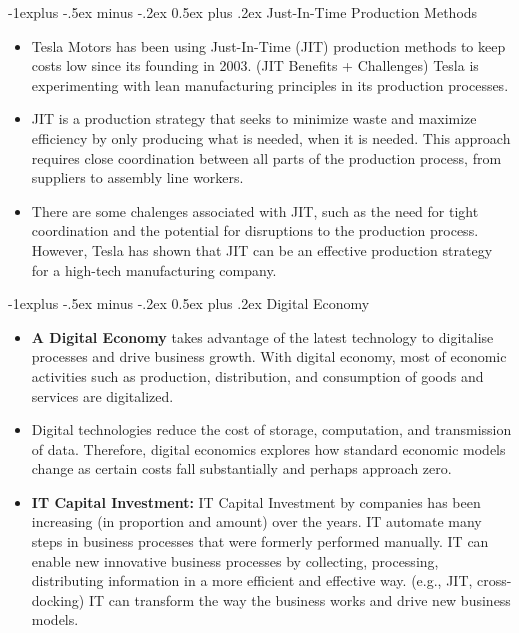 \documentclass[12pt, landscape]{article}
\makeatletter
\renewcommand{\subsection}{\@startsection{subsection}{2}{0mm}%
                                {-1explus -.5ex minus -.2ex}%
                                {0.5ex plus .2ex}%
                                {\normalfont\normalsize\bfseries}}
\makeatother
\begin{document}
\begin{multicols*}{3}
\subsection{Just-In-Time Production Methods}
\begin{itemize}
\item Tesla Motors has been using Just-In-Time (JIT) production methods to keep costs low since its founding in 2003. (JIT Benefits + Challenges) Tesla is experimenting with lean manufacturing principles in its production processes.
\item JIT is a production strategy that seeks to minimize waste and maximize efficiency by only producing what is needed, when it is needed. This approach requires close coordination between all parts of the production process, from suppliers to assembly line workers.
\item There are some chalenges associated with JIT, such as the need for tight coordination and the potential for disruptions to the production process. However, Tesla has shown that JIT can be an effective production strategy for a high-tech manufacturing company.
\end{itemize}

\subsection{Digital Economy}
\begin{itemize}
\item \textbf{A Digital Economy} takes advantage of the latest technology to digitalise processes and drive business growth. With digital economy, most of economic activities such as production, distribution, and consumption of goods and services are digitalized.
\item Digital technologies reduce the cost of storage, computation, and transmission of data. Therefore, digital economics explores how standard economic models change as certain costs fall substantially and perhaps approach zero.
\item \textbf{IT Capital Investment:} IT Capital Investment by companies has been increasing (in proportion and amount) over the years. IT automate many steps in business processes that were formerly performed manually. IT can enable new innovative business processes by collecting, processing, distributing information in a more efficient and effective way. (e.g., JIT, cross-docking) IT can transform the way the business works and drive new business models.
\end{itemize}

\end{multicols*}
\end{document}
